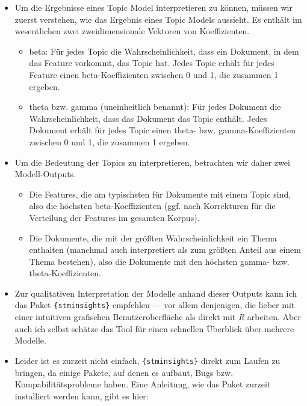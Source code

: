 \documentclass[
]{book}
\providecommand{\tightlist}{%
  \setlength{\itemsep}{0pt}\setlength{\parskip}{0pt}}
\begin{document}
\begin{itemize}
\tightlist
\item
  Um die Ergebnisse eines Topic Model interpretieren zu können, müssen wir zuerst verstehen, wie das Ergebnis eines Topic Models aussieht. Es enthält im wesentlichen zwei zweidimensionale Vektoren von Koeffizienten.

  \begin{itemize}
  \tightlist
  \item
    beta: Für jedes Topic die Wahrscheinlichkeit, dass ein Dokument, in dem das Feature vorkommt, das Topic hat. Jedes Topic erhält für jedes Feature einen beta-Koeffizienten zwischen 0 und 1, die zusammen 1 ergeben.
  \item
    theta bzw. gamma (uneinheitlich benannt): Für jedes Dokument die Wahrscheinlichkeit, dass das Dokument das Topic enthält. Jedes Dokument erhält für jedes Topic einen theta- bzw. gamma-Koeffizienten zwischen 0 und 1, die zusammen 1 ergeben.
  \end{itemize}
\item
  Um die Bedeutung der Topics zu interpretieren, betrachten wir daher zwei Modell-Outputs.

  \begin{itemize}
  \tightlist
  \item
    Die Features, die am typischsten für Dokumente mit einem Topic sind, also die höchsten beta-Koeffizienten (ggf. nach Korrekturen für die Verteilung der Features im gesamten Korpus).
  \item
    Die Dokumente, die mit der größten Wahrscheinlichkeit ein Thema enthalten (manchmal auch interpretiert als zum größten Anteil aus einem Thema bestehen), also die Dokumente mit den höchsten gamma- bzw. theta-Koeffizienten.
  \end{itemize}
\item
  Zur qualitativen Interpretation der Modelle anhand dieser Outputs kann ich das Paket \texttt{\{stminsights\}} empfehlen --- vor allem denjenigen, die lieber mit einer intuitiven grafischen Benutzeroberfläche als direkt mit \emph{R} arbeiten. Aber auch ich selbst schätze das Tool für einen schnellen Überblick über mehrere Modelle.
\item
  Leider ist es zurzeit nicht einfach, \texttt{\{stminsights\}} direkt zum Laufen zu bringen, da einige Pakete, auf denen es aufbaut, Bugs bzw. Kompabilitätsprobleme haben. Eine Anleitung, wie das Paket zurzeit installiert werden kann, gibt es hier:
\end{itemize}
\end{document}
